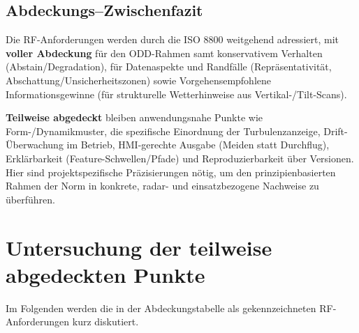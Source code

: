 \subsection*{Abdeckungs–Zwischenfazit}
Die RF-Anforderungen werden durch die ISO 8800 weitgehend adressiert, 
mit \textbf{voller Abdeckung} für den ODD-Rahmen samt konservativem Verhalten 
(Abstain/Degradation), für Datenaspekte und Randfälle (Repräsentativität, 
Abschattung/Unsicherheitszonen) sowie Vorgehensempfohlene Informationsgewinne 
(für strukturelle Wetterhinweise aus Vertikal-/Tilt-Scans). 

\medskip
\textbf{Teilweise abgedeckt} bleiben anwendungsnahe Punkte wie Form-/Dynamikmuster, 
die spezifische Einordnung der Turbulenzanzeige, Drift-Überwachung im Betrieb, HMI-gerechte 
Ausgabe (Meiden statt Durchflug), Erklärbarkeit (Feature-Schwellen/Pfade) und Reproduzierbarkeit 
über Versionen. Hier sind projektspezifische Präzisierungen nötig, um den prinzipienbasierten Rahmen 
der Norm in konkrete, radar- und einsatzbezogene Nachweise zu überführen.


\section{Untersuchung der teilweise abgedeckten Punkte}

Im Folgenden werden die in der Abdeckungstabelle als \covT gekennzeichneten RF-Anforderungen kurz diskutiert. 

